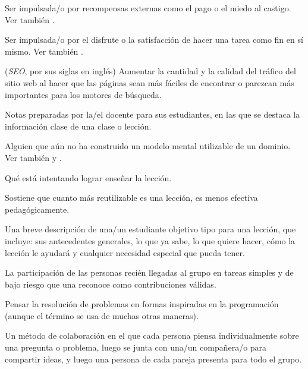 \begin{description}
 Ser impulsada/o por
recompensas externas como el pago o el miedo al castigo. Ver
también .

 Ser impulsada/o por el disfrute o
la satisfacción de hacer una tarea como fin en sí mismo.  Ver también
.

 (\emph{SEO}, por sus siglas en inglés)  Aumentar la cantidad y la calidad del tráfico del sitio web al hacer que las páginas sean más fáciles de encontrar o parezcan más importantes para los motores de búsqueda.

 Notas preparadas por la/el docente para sus estudiantes, en las que se destaca la 
información clase de una clase o lección. 

 Alguien que aún no ha construido un modelo mental utilizable de un dominio. 
Ver también  y .

 Qué está intentando lograr enseñar la lección.

 Sostiene que cuanto más reutilizable es una lección, 
es menos efectiva pedagógicamente.

 Una breve descripción de una/un estudiante objetivo tipo para una 
lección, que incluye: sus antecedentes generales, lo que ya sabe, lo que quiere hacer, cómo la lección le ayudará 
y cualquier necesidad especial que pueda tener.

 La participación de las personas recién 
llegadas al grupo en tareas simples y de bajo riesgo que una  
 reconoce como contribuciones válidas.

 Pensar la
resolución de problemas en formas inspiradas en la programación (aunque el término se usa de muchas otras maneras).

 Un método de colaboración
en el que cada persona piensa individualmente sobre una pregunta o problema,
luego se junta con una/un compañera/o para compartir ideas, y luego una persona de
cada pareja presenta para todo el grupo.


\end{description}
